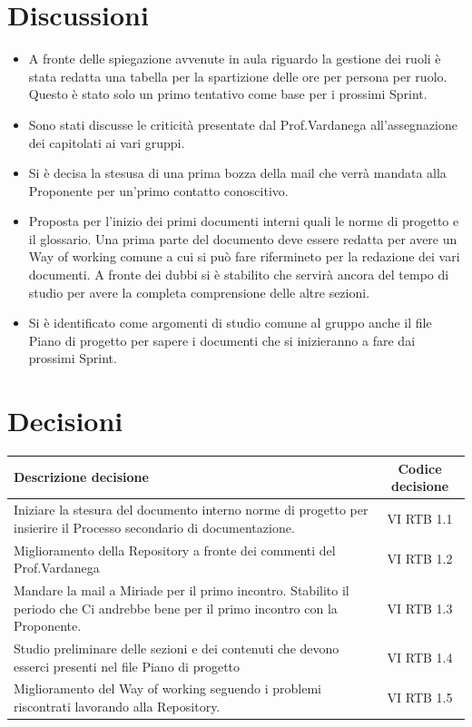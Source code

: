 \documentclass[a4paper,12pt]{article}
\newcommand{\ignoreglossary}{}
\begin{document}
\section{Discussioni}
\begin{itemize}
    \item A fronte delle spiegazione avvenute in aula riguardo la gestione dei ruoli è stata redatta una tabella per la spartizione delle ore per persona per ruolo. Questo è stato solo un primo tentativo come base per i prossimi Sprint.
    \item Sono stati discusse le criticità presentate dal Prof.Vardanega all'assegnazione dei capitolati ai vari gruppi.
    \item Si è decisa la stesusa di una prima bozza della mail che verrà mandata alla Proponente per un'primo contatto conoscitivo.
    \item Proposta per l'inizio dei primi documenti interni quali le norme di progetto e il glossario. Una prima parte del documento deve essere redatta per avere un Way of working comune a cui si può fare rifermineto per la redazione dei vari documenti. A fronte dei dubbi si è stabilito che servirà ancora del tempo di studio per avere la completa comprensione delle altre sezioni.
    \item Si è identificato come argomenti di studio comune al gruppo anche il file Piano di progetto per sapere i documenti che si inizieranno a fare dai prossimi Sprint.
\end{itemize}

\section{Decisioni}
\begin{center}
\small
\renewcommand{\arraystretch}{1.2} 
\begin{tabular}{|p{}|c|}
\hline
\rowcolor{gray!60} 
\textbf{Descrizione decisione} & \textbf{Codice decisione} \\
\hline
\rowcolor{white}
Iniziare la stesura del documento interno norme di progetto per insierire il Processo secondario di documentazione. & VI \ignoreglossary{RTB} 1.1 \\
\hline
\rowcolor{gray!20}
Miglioramento della Repository a fronte dei commenti del Prof.Vardanega &  VI \ignoreglossary{RTB} 1.2 \\
\hline
\rowcolor{white}
Mandare la mail a Miriade per il primo incontro. Stabilito il periodo che Ci andrebbe bene per il primo incontro con la Proponente. & VI \ignoreglossary{RTB} 1.3\\
\hline
\rowcolor{gray!20}
Studio preliminare delle sezioni e dei contenuti che devono esserci presenti nel file Piano di progetto &  VI \ignoreglossary{RTB} 1.4\\
\hline
\rowcolor{white}
Miglioramento del Way of working seguendo i problemi riscontrati lavorando alla Repository. &  VI \ignoreglossary{RTB} 1.5\\
\hline
\end{tabular}
\end{center}
\end{document}
